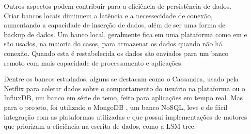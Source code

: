 Outros aspectos podem contribuir para a eficiência de persistência de dados. Criar bancos locais diminuem a latência e a necessecidade de conexão, aumentando a capacidade de inserção de dados, além de ser uma forma de backup de dados. Um banco local, geralmente fica em uma plataforma como em \cite{Paethong-Sato-Namiki} e são usados, na maioria do casos, para armazenar os dados quando não há conexão. Quando esta é restabelecida os dados são enviados para um banco remoto com mais capacidade de processamento e aplicações. %

Dentre os bancos estudados, alguns se destacam como o Cassandra, usado pela Netflix para coletar dados sobre o comportamento do usuário na plataforma ou o InfluxDB, um banco em série de temo, feito para aplicações em tempo real. Mas para o projeto, foi utilizado o MongoDB \cite{mongodb}, um banco NoSQL, leve e de fácil integração com as plataformas utilizadas e que possui implementações de motores que priorizam a eficiência na escrita de dados, como a LSM tree.




